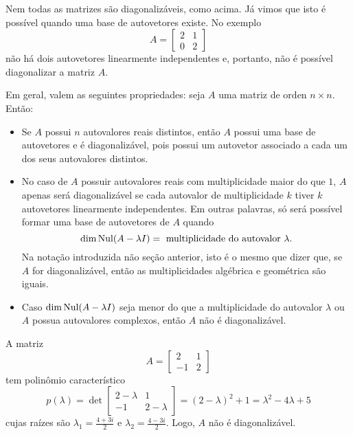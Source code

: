 \documentclass[../livro.tex]{subfiles}  %
\begin{document}
Nem todas as matrizes são diagonalizáveis, como acima. Já vimos que isto é possível quando uma base de autovetores existe. No exemplo
\[
A = \begin{bmatrix}
2&1 \\ 0&2
\end{bmatrix}
\] não há dois autovetores linearmente independentes e, portanto, não é possível diagonalizar a matriz $A$.


\vspace{0.3cm}

Em geral, valem as seguintes propriedades: seja $A$ uma matriz de orden $n \times n$. Então:
\begin{itemize}
	\item Se $A$ possui $n$ autovalores reais distintos, então $A$ possui uma base de autovetores e é diagonalizável, pois possui um autovetor associado a cada um dos seus autovalores distintos.
	\item No caso de $A$ possuir autovalores reais com multiplicidade maior do que $1$, $A$ apenas será diagonalizável se cada autovalor de multiplicidade $k$ tiver $k$ autovetores linearmente independentes. Em outras palavras, só será possível formar uma base de autovetores de $A$ quando 
	\[
	\operatorname{dim} \operatorname{Nul} (A - \lambda I) = \text{ multiplicidade do autovalor } \lambda.
	\] Na notação introduzida não seção anterior, isto é o mesmo que dizer que, se $A$ for diagonalizável, então as multiplicidades algébrica e geométrica são iguais.
	\item Caso $\dim \operatorname{Nul} (A - \lambda I)$ seja menor do que a multiplicidade do autovalor $\lambda$ ou $A$ possua autovalores complexos, então $A$ não é diagonalizável.
\end{itemize}


\begin{example}
	A matriz
	\[
	A = \begin{bmatrix}
	2&1 \\ -1&2
	\end{bmatrix}
	\] tem polinômio característico 
	\[
	p(\lambda) = \det \begin{bmatrix}
	2-\lambda&1 \\ -1&2-\lambda
	\end{bmatrix} = (2-\lambda)^2 +1 = \lambda^2 -4\lambda +5
	\] cujas raízes são $\lambda_1 = \frac{4 + 3i}{2}$ e $\lambda_2 = \frac{4 - 3i}{2}$. Logo, $A$ não é diagonalizável.
\end{example}
\end{document}
